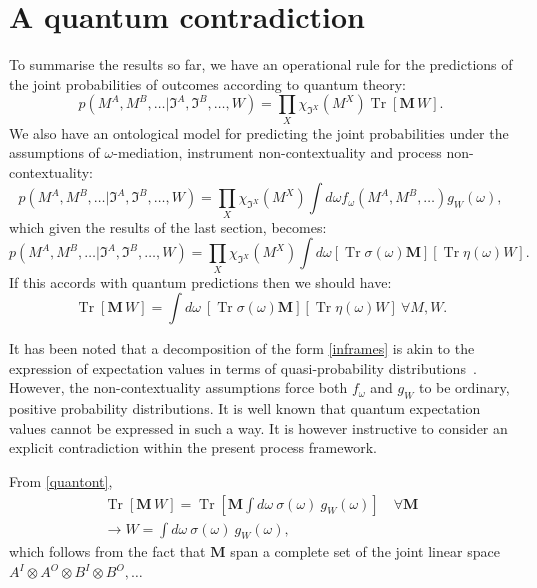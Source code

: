 \documentclass[a4paper,onecolumn,11pt,accepted=2018-05-04]{quantumarticle}
\DeclareMathOperator{\tr}{Tr}
\begin{document}
\section{A quantum contradiction}\label{contradiction}

To summarise the results so far, we have an operational rule for the predictions of the joint probabilities of outcomes according to quantum theory:
\begin{equation}
p(M^A, M^B,\dots|\mathfrak{I}^A, \mathfrak{I}^B,\dots, W)  =\prod_{X} \chi_{\mathfrak{I}^X}(M^X)\tr\left[\mathbf{M}\,W\right] .
\end{equation} 
We also have an ontological model for predicting the joint probabilities under the assumptions of $\omega$-mediation, instrument non-contextuality and process non-contextuality:
%
\begin{equation}\label{inframes}
p(M^A, M^B,\dots|\mathfrak{I}^A, \mathfrak{I}^B,\dots, W)  = \prod_{X}  \chi_{\mathfrak{I}^X}(M^X) \int d\omega f_\omega(M^A, M^B, \dots) g_W(\omega),
\end{equation}
%
which given the results of the last section, becomes:
\begin{equation}
p(M^A, M^B,\dots|\mathfrak{I}^A, \mathfrak{I}^B,\dots, W) =  \prod_{X} \chi_{\mathfrak{I}^X}(M^X)\int d\omega \left[ \tr \sigma(\omega) \mathbf{M}\right] \left[\tr \eta(\omega)W\right].
\end{equation}
%
If this accords with quantum predictions then we should have:
\begin{equation}\label{quantont}
\tr\left[\mathbf{M}\,W\right] =  \int d\omega~\left[ \tr \sigma(\omega) \mathbf{M}\right] \left[\tr \eta(\omega)W\right]~\forall M, W.
\end{equation}

It has been noted \cite{spekkens08} that a decomposition of the form \eqref{inframes} is akin to the expression of expectation values in terms of quasi-probability distributions~\cite{Wigner1932, Scully1997}. However, the non-contextuality assumptions force both $f_\omega$ and $g_W$ to be ordinary, positive probability distributions. It is well known that quantum expectation values cannot be expressed in such a way. It is however instructive to consider an explicit contradiction within the present process framework.

From \eqref{quantont},
\begin{eqnarray}
\tr\left[\mathbf{M}\, W\right] =  \tr\left[\mathbf{M} \int d\omega~\sigma(\omega)~g_W(\omega)\right] \quad \forall \mathbf{M} \\
\rightarrow W= \int d\omega~\sigma(\omega)~g_W(\omega),
\label{ned}
\end{eqnarray}
which follows from the fact that $\mathbf{M}$ span a complete set of the joint linear space $A^I\otimes A^O\otimes B^I\otimes B^O,\dots$
\end{document}
